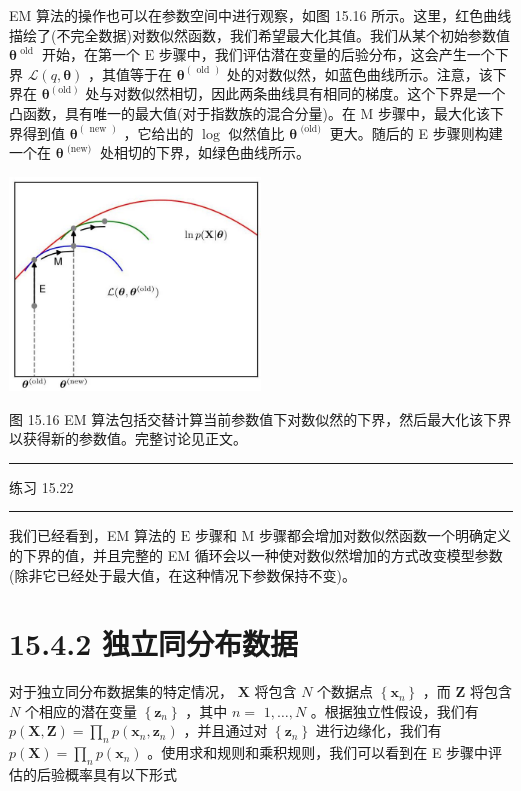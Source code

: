 \documentclass[10pt]{article}
\newcommand{\HRule}{\begin{center}\rule{0.9\linewidth}{0.2mm}\end{center}}
\begin{document}
EM 算法的操作也可以在参数空间中进行观察，如图 15.16 所示。这里，红色曲线描绘了(不完全数据)对数似然函数，我们希望最大化其值。我们从某个初始参数值 \({\mathbf{\theta }}^{\text{ old }}\) 开始，在第一个 \(\mathrm{E}\) 步骤中，我们评估潜在变量的后验分布，这会产生一个下界 \(\mathcal{L}\left( {q,\mathbf{\theta }}\right)\) ，其值等于在 \({\mathbf{\theta }}^{\left( \text{ old }\right) }\) 处的对数似然，如蓝色曲线所示。注意，该下界在 \({\mathbf{\theta }}^{\left( \mathrm{{old}}\right) }\) 处与对数似然相切，因此两条曲线具有相同的梯度。这个下界是一个凸函数，具有唯一的最大值(对于指数族的混合分量)。在 M 步骤中，最大化该下界得到值 \({\mathbf{\theta }}^{\left( \text{ new }\right) }\) ，它给出的 \(\log\) 似然值比 \({\mathbf{\theta }}^{\text{ (old) }}\) 更大。随后的 E 步骤则构建一个在 \({\mathbf{\theta }}^{\text{ (new) }}\) 处相切的下界，如绿色曲线所示。

\begin{center}
\includegraphics[max width=0.5\textwidth]{images/0194e279-9b28-703a-88f4-c3ac21e2010d_507_885_345_668_568_0.jpg}
\end{center}
\hspace*{3em} 

图 15.16 EM 算法包括交替计算当前参数值下对数似然的下界，然后最大化该下界以获得新的参数值。完整讨论见正文。

\HRule

练习 15.22

\HRule

我们已经看到，EM 算法的 \(\mathrm{E}\) 步骤和 \(\mathrm{M}\) 步骤都会增加对数似然函数一个明确定义的下界的值，并且完整的 EM 循环会以一种使对数似然增加的方式改变模型参数(除非它已经处于最大值，在这种情况下参数保持不变)。

\section*{15.4.2 独立同分布数据}

对于独立同分布数据集的特定情况， \(\mathbf{X}\) 将包含 \(N\) 个数据点 \(\left\{  {\mathbf{x}}_{n}\right\}\) ，而 \(\mathbf{Z}\) 将包含 \(N\) 个相应的潜在变量 \(\left\{  {\mathbf{z}}_{n}\right\}\) ，其中 \(n =\)  \(1,\ldots ,N\) 。根据独立性假设，我们有 \(p\left( {\mathbf{X},\mathbf{Z}}\right)  = \mathop{\prod }\limits_{n}p\left( {{\mathbf{x}}_{n},{\mathbf{z}}_{n}}\right)\) ，并且通过对 \(\left\{  {\mathbf{z}}_{n}\right\}\) 进行边缘化，我们有 \(p\left( \mathbf{X}\right)  = \mathop{\prod }\limits_{n}p\left( {\mathbf{x}}_{n}\right)\) 。使用求和规则和乘积规则，我们可以看到在 E 步骤中评估的后验概率具有以下形式
\end{document}
